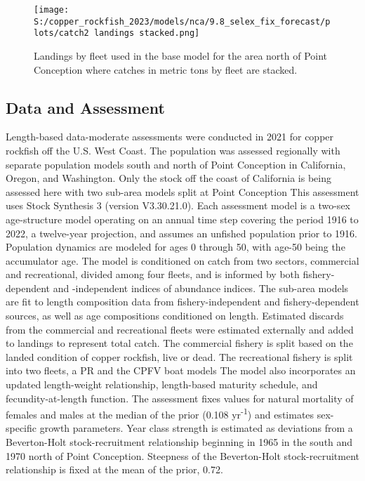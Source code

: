 \documentclass[11pt,
  english,
  letterpaper,
]{article}
\begin{document}
\begin{figure}
\centering
\texttt{[image: S:/copper\_rockfish\_2023/models/nca/9.8\_selex\_fix\_forecast/plots/catch2 landings stacked.png]}
\caption{Landings by fleet used in the base model for the area north of Point Conception where catches in metric tons by fleet are stacked.\label{fig:es-north-catch}}
\end{figure}

\pagebreak

\hypertarget{data-and-assessment}{%
\subsection*{Data and Assessment}\label{data-and-assessment}}

Length-based data-moderate assessments were conducted in 2021 for copper rockfish off the U.S. West Coast. The population was assessed regionally with separate population models south and north of Point Conception in California, Oregon, and Washington. Only the stock off the coast of California is being assessed here with two sub-area models split at Point Conception This assessment uses Stock Synthesis 3 (version V3.30.21.0). Each assessment model is a two-sex age-structure model operating on an annual time step covering the period 1916 to 2022, a twelve-year projection, and assumes an unfished population prior to 1916. Population dynamics are modeled for ages 0 through 50, with age-50 being the accumulator age. The model is conditioned on catch from two sectors, commercial and recreational, divided among four fleets, and is informed by both fishery-dependent and -independent indices of abundance indices. The sub-area models are fit to length composition data from fishery-independent and fishery-dependent sources, as well as age compositions conditioned on length. Estimated discards from the commercial and recreational fleets were estimated externally and added to landings to represent total catch. The commercial fishery is split based on the landed condition of copper rockfish, live or dead. The recreational fishery is split into two fleets, a PR and the CPFV boat models The model also incorporates an updated length-weight relationship, length-based maturity schedule, and fecundity-at-length function. The assessment fixes values for natural mortality of females and males at the median of the prior (0.108 yr\textsuperscript{-1}) and estimates sex-specific growth parameters. Year class strength is estimated as deviations from a Beverton-Holt stock-recruitment relationship beginning in 1965 in the south and 1970 north of Point Conception. Steepness of the Beverton-Holt stock-recruitment relationship is fixed at the mean of the prior, 0.72.
\end{document}
